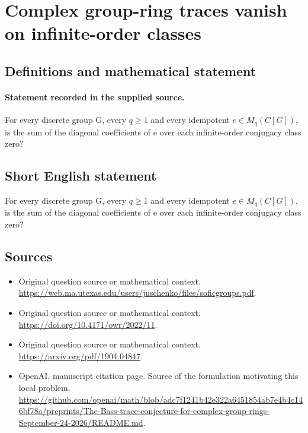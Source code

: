 \documentclass[11pt]{article}
\begin{document}
\section*{Complex group-ring traces vanish on infinite-order classes}\label{statement}
\subsection{Definitions and mathematical statement}
\paragraph{Statement recorded in the supplied source.}
For every discrete group G, every $q\geq 1$ and every idempotent $e\in M_q(C[G])$, is the sum of the diagonal coefficients of e over each infinite-order conjugacy class zero?
\subsection{Short English statement}
For every discrete group G, every $q\geq 1$ and every idempotent $e\in M_q(C[G])$, is the sum of the diagonal coefficients of e over each infinite-order conjugacy class zero?
\subsection{Sources}
\begin{itemize}
\item[S1] Original question source or mathematical context.
\url{https://web.ma.utexas.edu/users/juschenko/files/soficgroups.pdf}.
\item[S2] Original question source or mathematical context.
\url{https://doi.org/10.4171/owr/2022/11}.
\item[S3] Original question source or mathematical context.
\url{https://arxiv.org/pdf/1904.04847}.
\item[S4] OpenAI, manuscript citation page. Source of the formulation motivating this local problem.
\url{https://github.com/openai/math/blob/adc7f1241b42e322a6451854ab7e4b4c146bf78a/preprints/The-Bass-trace-conjecture-for-complex-group-rings-September-24-2026/README.md}.
\end{itemize}
\end{document}
